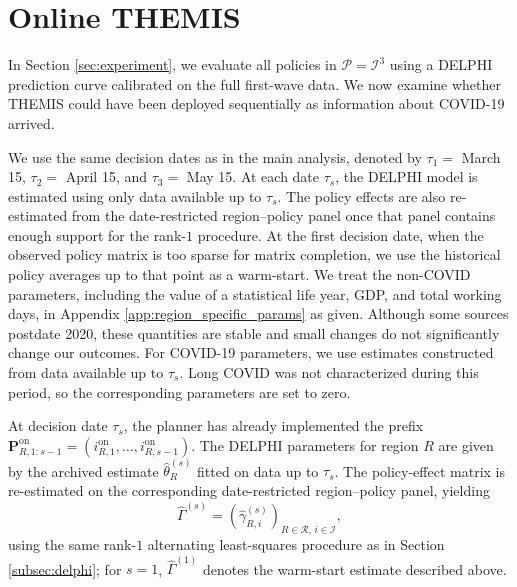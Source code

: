 \documentclass[msom,blindrev]{informs3} %
\newcommand{\rev}[1]{{\color{blue}#1}}
\begin{document}
\section{\rev{Online THEMIS}}
\label{sec:online_themis}
{\color{blue}
In Section \ref{sec:experiment}, we evaluate all policies in $\mathcal{P}=\mathcal{I}^3$ using a DELPHI prediction curve calibrated on the full first-wave data. We now examine whether THEMIS could have been deployed sequentially as information about COVID-19 arrived.

We use the same decision dates as in the main analysis, denoted by $\tau_1=$ March 15, $\tau_2=$ April 15, and $\tau_3=$ May 15. At each date $\tau_s$, the DELPHI model is estimated using only data available up to $\tau_s$. The policy effects are also re-estimated from the date-restricted region--policy panel once that panel contains enough support for the rank-$1$ procedure. At the first decision date, when the observed policy matrix is too sparse for matrix completion, we use the historical policy averages up to that point as a warm-start. We treat the non-COVID parameters, including the value of a statistical life year, GDP, and total working days, in Appendix \ref{app:region_specific_params} as given. Although some sources postdate 2020, these quantities are stable and small changes do not significantly change our outcomes. For COVID-19 parameters, we use estimates constructed from data available up to $\tau_s$. Long COVID was not characterized during this period, so the corresponding parameters are set to zero.

At decision date $\tau_s$, the planner has already implemented the prefix $\bm{P}_{R,1:s-1}^{\mathrm{on}}=(i_{R,1}^{\mathrm{on}},\ldots,i_{R,s-1}^{\mathrm{on}})$. The DELPHI parameters for region $R$ are given by the archived estimate $\hat{\theta}_R^{(s)}$ fitted on data up to $\tau_s$. The policy-effect matrix is re-estimated on the corresponding date-restricted region--policy panel, yielding
\[
    \hat{\Gamma}^{(s)}
    =
    \left(\hat{\gamma}_{R,i}^{(s)}\right)_{R\in\mathcal{R},\,i\in\mathcal{I}},
\]
using the same rank-$1$ alternating least-squares procedure as in Section \ref{subsec:delphi}; for $s=1$, $\hat{\Gamma}^{(1)}$ denotes the warm-start estimate described above.

}
\end{document}
